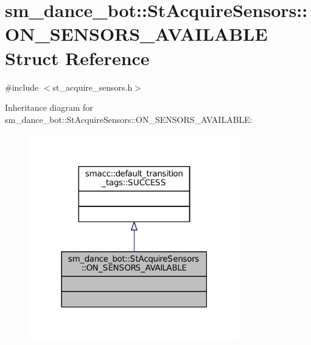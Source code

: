 \hypertarget{structsm__dance__bot_1_1StAcquireSensors_1_1ON__SENSORS__AVAILABLE}{}\section{sm\+\_\+dance\+\_\+bot\+:\+:St\+Acquire\+Sensors\+:\+:O\+N\+\_\+\+S\+E\+N\+S\+O\+R\+S\+\_\+\+A\+V\+A\+I\+L\+A\+B\+LE Struct Reference}
\label{structsm__dance__bot_1_1StAcquireSensors_1_1ON__SENSORS__AVAILABLE}


{\ttfamily \#include $<$st\+\_\+acquire\+\_\+sensors.\+h$>$}



Inheritance diagram for sm\+\_\+dance\+\_\+bot\+:\+:St\+Acquire\+Sensors\+:\+:O\+N\+\_\+\+S\+E\+N\+S\+O\+R\+S\+\_\+\+A\+V\+A\+I\+L\+A\+B\+LE\+:
\nopagebreak
\begin{figure}[H]
\begin{center}
\leavevmode
\includegraphics[width=259pt]{structsm__dance__bot_1_1StAcquireSensors_1_1ON__SENSORS__AVAILABLE__inherit__graph}
\end{center}
\end{figure}


